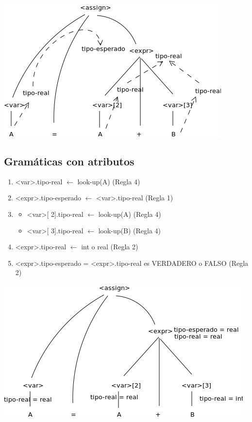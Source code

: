 \documentclass[11pt]{article}
\begin{document}
\begin{center}
\includegraphics[width=.9\linewidth]{attribgram2.png}
\end{center}

\subsection*{Gramáticas con atributos}
\label{sec:org0ee1416}
\begin{enumerate}
\item <var>.tipo-real \(\leftarrow\) look-up(A) (Regla 4)
\item <expr>.tipo-esperado \(\leftarrow\) <var>.tipo-real (Regla 1)
\item \begin{itemize}
\item <var>[ 2].tipo-real \(\leftarrow\) look-up(A) (Regla 4)
\item <var>[ 3].tipo-real \(\leftarrow\) look-up(B) (Regla 4)
\end{itemize}
\item <expr>.tipo-real \(\leftarrow\) int o real (Regla 2)

\item <expr>.tipo-esperado = <expr>.tipo-real es VERDADERO o FALSO (Regla 2)
\end{enumerate}

\begin{center}
\includegraphics[width=.9\linewidth]{attribgram3.png}
\end{center}
\end{document}
